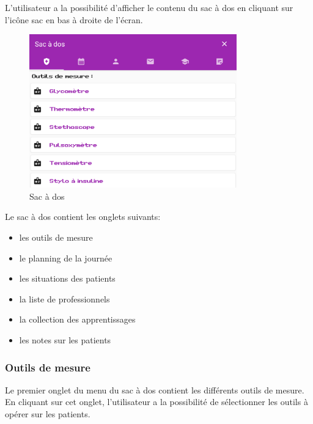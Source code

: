 L'utilisateur a la possibilité d'afficher le contenu du sac à dos en cliquant sur l'icône sac en bas à droite de l'écran.

\begin{figure}[H]
    \centering
    \includegraphics[width=0.8\textwidth ]{images/toolsMenu/toolbox.png}
    \caption{Sac à dos}
    \label{fig:pic_dessus}
\end{figure}

Le sac à dos contient les onglets suivants:
\begin{itemize}
    \item les outils de mesure
    \item le planning de la journée
    \item les situations des patients
    \item la liste de professionnels
    \item la collection des apprentissages
    \item les notes sur les patients
\end{itemize}


\subsubsection*{Outils de mesure}

Le premier onglet du menu du sac à dos contient les différents outils de mesure. En cliquant sur cet onglet, l'utilisateur a la possibilité de sélectionner les outils à opérer sur les patients. \\

